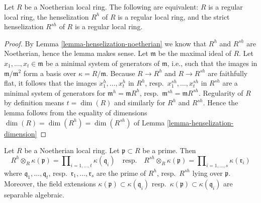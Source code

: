 \begin{lemma}
\label{lemma-henselization-regular}
Let $R$ be a Noetherian local ring. The following are equivalent:
$R$ is a regular local ring, the henselization $R^h$ of $R$ is a regular
local ring, and the strict henselization $R^{sh}$ of $R$ is a regular
local ring.
\end{lemma}

\begin{proof}
By
Lemma \ref{lemma-henselization-noetherian}
we know that $R^h$ and $R^{sh}$ are Noetherian, hence the lemma makes
sense. Let $\mathfrak m$ be the maximal ideal of $R$.
Let $x_1, \ldots, x_t \in \mathfrak m$ be a minimal system of
generators of $\mathfrak m$, i.e., such that the images in
$\mathfrak m/\mathfrak m^2$ form a basis over $\kappa = R/\mathfrak m$.
Because $R \to R^h$ and $R \to R^{sh}$ are faithfully flat, it follows
that the images $x_1^h, \ldots, x_t^h$ in $R^h$,
resp.\  $x_1^{sh}, \ldots, x_t^{sh}$ in $R^{sh}$
are a minimal system of generators for
$\mathfrak m^h = \mathfrak mR^h$,
resp.\ $\mathfrak m^{sh} = \mathfrak mR^{sh}$.
Regularity of $R$ by definition means $t = \dim(R)$ and similarly
for $R^h$ and $R^{sh}$. Hence the lemma follows from the equality
of dimensions $\dim(R) = \dim(R^h) = \dim(R^{sh})$ of
Lemma \ref{lemma-henselization-dimension}
\end{proof}

\begin{lemma}
\label{lemma-fibres-henselization}
Let $R$ be a Noetherian local ring. Let $\mathfrak p \subset R$ be a prime.
Then
$$
R^h \otimes_R \kappa(\mathfrak p) =
\prod\nolimits_{i = 1, \ldots, t} \kappa(\mathfrak q_i)
\quad\text{resp.}\quad
R^{sh} \otimes_R \kappa(\mathfrak p) =
\prod\nolimits_{i = 1, \ldots, s} \kappa(\mathfrak r_i)
$$
where $\mathfrak q_1, \ldots, \mathfrak q_t$,
resp.\ $\mathfrak r_1, \ldots, \mathfrak r_s$
are the prime of $R^h$, resp.\ $R^{sh}$ lying over $\mathfrak p$.
Moreover, the field extensions
$\kappa(\mathfrak p) \subset \kappa(\mathfrak q_i)$
resp.\ $\kappa(\mathfrak p) \subset \kappa(\mathfrak q_i)$
are separable algebraic.
\end{lemma}

